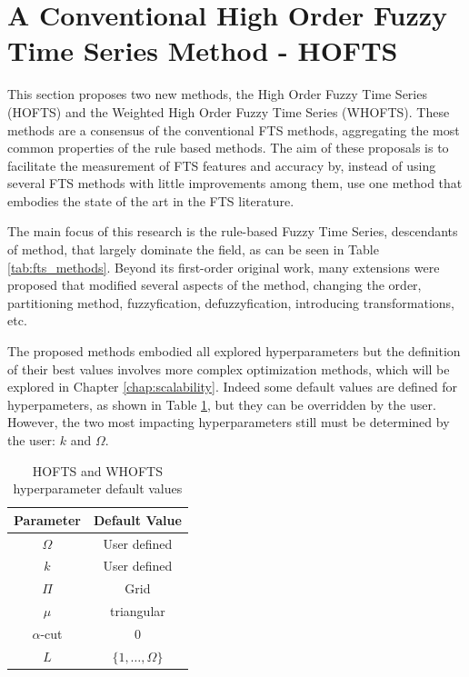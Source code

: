 %
\section{A Conventional High Order Fuzzy Time Series Method - HOFTS}
\label{sec:fts_hofts}

This section proposes two new methods, the High Order Fuzzy Time Series (HOFTS) and the Weighted High Order Fuzzy Time Series (WHOFTS). These methods are a consensus  of the conventional FTS methods, aggregating the most common properties of the rule based methods. The aim of these proposals is to facilitate the measurement of FTS features and accuracy by, instead of using several FTS methods with little improvements among them, use one method that embodies the state of the art in the FTS literature. 

The main focus of this research is the rule-based Fuzzy Time Series, descendants of \cite{chen1996forecasting} method, that  largely dominate the field, as can be seen in Table \ref{tab:fts_methods}. Beyond its first-order original work, many extensions were proposed that modified several aspects of the method, changing the order, partitioning method, fuzzyfication, defuzzyfication, introducing transformations, etc. 

The proposed methods embodied all explored hyperparameters but the definition of their best values involves more complex optimization methods, which will be explored in Chapter \ref{chap:scalability}. Indeed some default values are defined for hyperpameters, as shown in Table \ref{tab:hofts_hyperparam}, but they can be overridden by the user. However, the two most impacting hyperparameters still must be determined by the user: $k$ and $\Omega$.

\begin{table}[htb] 
    \centering
    \begin{tabular}{|c|c|} \hline
        \textbf{Parameter} & \textbf{Default Value}  \\ \hline
        $\Omega$ & User defined  \\ \hline
        $k$ & User defined  \\ \hline
        $\Pi$ & Grid \\ \hline
        $\mu$ & triangular  \\ \hline 
        $\alpha$-cut & 0 \\ \hline
        $L$ & $\{1,\ldots,\Omega\}$  \\ \hline
    \end{tabular}
    \caption{HOFTS and WHOFTS hyperparameter default values}
    \label{tab:hofts_hyperparam}
\end{table}

